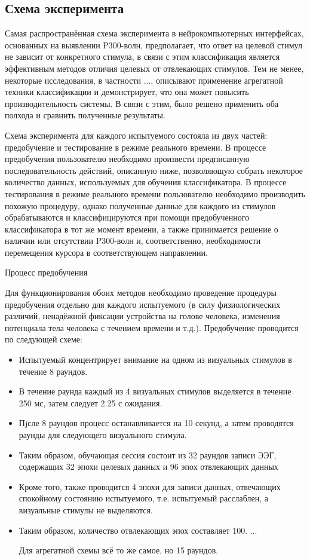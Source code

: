 \documentclass[12pt,fleqn]{article}
\begin{document}
\subsection{Схема эксперимента}
	\par Самая распространённая схема эксперимента в нейрокомпьютерных интерфейсах, основанных на выявлении P300-волн, предполагает, что ответ на целевой стимул не зависит от конкретного стимула, в связи с этим классификация является эффективным методов отличия целевых от отвлекающих стимулов. Тем не менее, некоторые исследования, в частности ..., описывают применение агрегатной техники классификации и демонстрирует, что она может повысить производительность системы. В связи с этим, было решено применить оба полхода и сравнить полученные результаты.
	\par Схема эксперимента для каждого испытуемого состояла из двух частей: предобучение и тестирование в режиме реального времени. В процессе предобучения пользователю необходимо произвести предписанную последовательность действий, описанную ниже, позволяющую собрать некоторое количество данных, используемых для обучения классификатора. В процессе тестирования в режиме реального времени пользователю необходимо производить похожую процедуру, однако полученные данные для каждого из стимулов обрабатываются и классифицируются при помощи предобученного классификатора в тот же момент времени, а также принимается решение о наличии или отсутствии P300-волн и, соответственно, необходимости перемещения курсора в соответствующем направлении.
	\par Процесс предобучения
	\par Для функционирования обоих методов необходимо проведение процедуры предобучения отдельно для каждого испытуемого (в силу физиологических различий, ненадёжной фиксации устройства на голове человека, изменения потенциала тела человека с течением времени и т.д.). Предобучение проводится по следующей схеме:
	\begin{itemize} 
	\item
	Испытуемый концентрирует внимание на одном из визуальных стимулов в течение 8 раундов.
	\item
	В течение раунда каждый из 4 визуальных стимулов выделяется в течение 250 мс, затем следует 2.25 с ожидания.
	\item
	Пjсле 8 раундов процесс останавливается на 10 секунд, а затем проводятся раунды для следующего визуального стимула.
	\item
	Таким образом, обучающая сессия состоит из 32 раундов записи ЭЭГ, содержащих 32 эпохи целевых данных и 96 эпох отвлекающих данных
	\item
	Кроме того, также проводится 4 эпохи для записи данных, отвечающих спокойному состоянию испытуемого, т.е. испытуемый расслаблен, а визуальные стимулы не выделяются.
	\item
	Таким образом, количество отвлекающих эпох составляет 100. ...
	\par Для агрегатной схемы всё то же самое, но 15 раундов.	
	\end{itemize}
\end{document}
